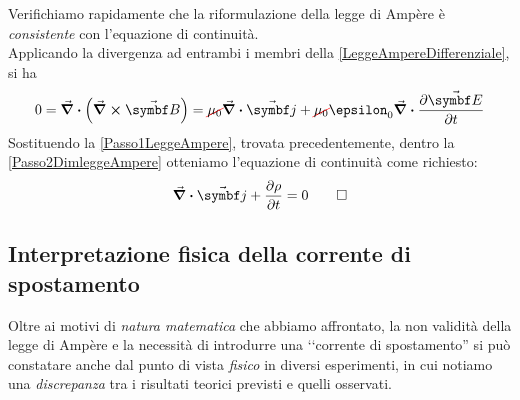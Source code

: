 \begin{demonstration}
	Verifichiamo rapidamente che la riformulazione della legge di Ampère è \textit{consistente} con l'equazione di continuità.\\ 
	Applicando la divergenza ad entrambi i membri della \eqref{LeggeAmpereDifferenziale}, si ha
	\begin{equation}
		0=\div{\left(\curl{\vba{B}}\right)}=\Ccancel[red]{\mu_0}\div{\vba{j}}+\Ccancel[red]{\mu_0}\epsilon_0\div{\pdv{\vba{E}}{t}}\label{Passo2DimleggeAmpere} 
	\end{equation}
	Sostituendo la \eqref{Passo1LeggeAmpere}, trovata precedentemente, dentro la \eqref{Passo2DimleggeAmpere} otteniamo l'equazione di continuità come richiesto:
	\begin{equation*}
		\div{\vba{j}}+\pdv{\rho}{t}=0\qedhere
	\end{equation*}
\end{demonstration}
\subsection{Interpretazione fisica della corrente di spostamento}
Oltre ai motivi di \textit{natura matematica} che abbiamo affrontato, la non validità della legge di Ampère e la necessità di introdurre una ‘‘corrente di spostamento'' si può constatare anche dal punto di vista \textit{fisico} in diversi esperimenti, in cui notiamo una \textit{discrepanza} tra i risultati teorici previsti e quelli osservati.

